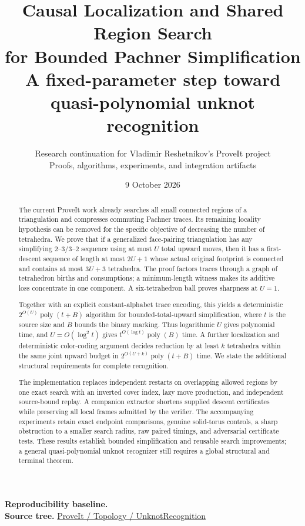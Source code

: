 \documentclass[11pt]{article}
\title{\color{inkblue}\LARGE Causal Localization and Shared Region Search\\[5pt]
  \Large for Bounded Pachner Simplification\\[9pt]
  \large A fixed-parameter step toward quasi-polynomial unknot recognition}
\author{Research continuation for Vladimir Reshetnikov's ProveIt project\\
  \small Proofs, algorithms, experiments, and integration artifacts}
\date{9 October 2026}
\theoremstyle{definition}
\newcommand{\poly}{\operatorname{poly}}
\newcommand{\code}[1]{\texttt{\small\detokenize{#1}}}
\begin{document}
\maketitle
\begin{abstract}
The current ProveIt work already searches all small connected regions of a
triangulation and compresses commuting Pachner traces. Its remaining locality
hypothesis can be removed for the specific objective of decreasing the number
of tetrahedra. We prove that if a generalized face-pairing triangulation has
any simplifying $2$--$3$/$3$--$2$ sequence using at most $U$ total upward moves,
then it has a first-descent sequence of length at most $2U+1$ whose actual
original footprint is connected and contains at most $3U+3$ tetrahedra.
The proof factors traces through a graph of tetrahedron births and consumptions;
a minimum-length witness makes its additive loss concentrate in one component.
A six-tetrahedron ball proves sharpness at $U=1$.

Together with an explicit constant-alphabet trace encoding, this yields a
deterministic $2^{O(U)}\poly(t+B)$ algorithm for bounded-total-upward
simplification, where $t$ is the source size and $B$ bounds the binary marking.
Thus logarithmic $U$ gives polynomial time, and $U=O(\log^2 t)$ gives
$t^{O(\log t)}\poly(B)$ time. A further localization and deterministic
color-coding argument decides reduction by at least $k$ tetrahedra within
the same joint upward budget in $2^{O(U+k)}\poly(t+B)$ time. We state the
additional structural requirements for complete recognition.

The implementation replaces independent restarts on overlapping allowed
regions by one exact search with an inverted cover index, lazy move production,
and independent source-bound replay. A companion extractor shortens supplied
descent certificates while preserving all local frames admitted by the verifier.
The accompanying experiments retain exact endpoint comparisons, genuine
solid-torus controls, a sharp obstruction to a smaller search radius, raw paired
timings, and adversarial certificate tests. These results establish bounded
simplification and reusable search improvements; a general quasi-polynomial
unknot recognizer still requires a global structural and terminal theorem.
\end{abstract}
\vspace{5pt}
\noindent\textbf{Reproducibility baseline.}\quad
\code{8188525b70033dcfe7c51ea5ae2c8723ad0c0198}\\
\noindent\textbf{Source tree.}\quad
\href{https://github.com/VladimirReshetnikov/ProveIt/tree/main/Topology/UnknotRecognition}{ProveIt / Topology / UnknotRecognition}
\clearpage
\tableofcontents
\clearpage








\end{document}
